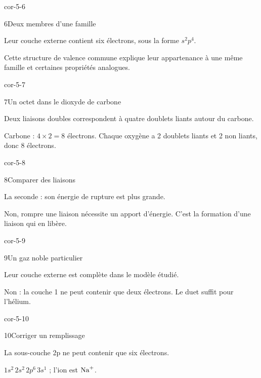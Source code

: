 \begin{blocLivre}{cor-5-6}\begin{corrige}{6}{Deux membres d’une famille}
\begin{questions}
\item Leur couche externe contient six électrons, sous la forme $s^2p^4$.
\item Cette structure de valence commune explique leur appartenance à une même famille et certaines propriétés analogues.
\end{questions}
\end{corrige}\end{blocLivre}
\begin{blocLivre}{cor-5-7}\begin{corrige}{7}{Un octet dans le dioxyde de carbone}
\begin{questions}
\item Deux liaisons doubles correspondent à quatre doublets liants autour du carbone.
\item Carbone : $4\times2=8$ électrons. Chaque oxygène a 2 doublets liants et 2 non liants, donc 8 électrons.
\end{questions}
\end{corrige}\end{blocLivre}
\begin{blocLivre}{cor-5-8}\begin{corrige}{8}{Comparer des liaisons}
\begin{questions}
\item La seconde : son énergie de rupture est plus grande.
\item Non, rompre une liaison nécessite un apport d’énergie. C’est la formation d’une liaison qui en libère.
\end{questions}
\end{corrige}\end{blocLivre}
\begin{blocLivre}{cor-5-9}\begin{corrige}{9}{Un gaz noble particulier}
\begin{questions}
\item Leur couche externe est complète dans le modèle étudié.
\item Non : la couche 1 ne peut contenir que deux électrons. Le duet suffit pour l’hélium.
\end{questions}
\end{corrige}\end{blocLivre}
\begin{blocLivre}{cor-5-10}\begin{corrige}{10}{Corriger un remplissage}
\begin{questions}
\item La sous-couche 2p ne peut contenir que six électrons.
\item $1s^2\,2s^2\,2p^6\,3s^1$ ; l’ion est $\ce{Na+}$.
\end{questions}
\end{corrige}\end{blocLivre}
